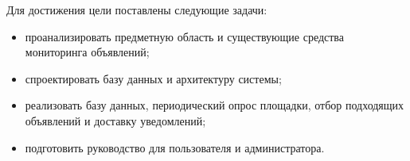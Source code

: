 Для достижения цели поставлены следующие задачи:
\begin{itemize}
	\item проанализировать предметную область и существующие средства мониторинга объявлений;
	\item спроектировать базу данных и архитектуру системы;
	\item реализовать базу данных, периодический опрос площадки, отбор подходящих объявлений и доставку уведомлений;
	\item подготовить руководство для пользователя и администратора.
\end{itemize}
